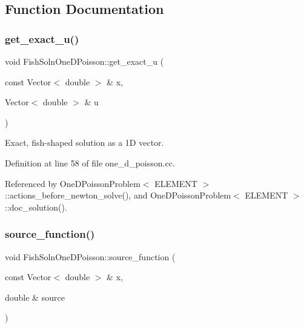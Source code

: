 \subsection{Function Documentation}
\mbox{\label{namespaceFishSolnOneDPoisson_a52c9346f567cb68fe20268a592deb4bc}} 
\subsubsection{\texorpdfstring{get\+\_\+exact\+\_\+u()}{get\_exact\_u()}}
{\footnotesize\ttfamily void Fish\+Soln\+One\+D\+Poisson\+::get\+\_\+exact\+\_\+u (\begin{DoxyParamCaption}\item[{const Vector$<$ double $>$ \&}]{x,  }\item[{Vector$<$ double $>$ \&}]{u }\end{DoxyParamCaption})}



Exact, fish-\/shaped solution as a 1D vector. 



Definition at line 58 of file one\+\_\+d\+\_\+poisson.\+cc.



Referenced by One\+D\+Poisson\+Problem$<$ E\+L\+E\+M\+E\+N\+T $>$\+::actions\+\_\+before\+\_\+newton\+\_\+solve(), and One\+D\+Poisson\+Problem$<$ E\+L\+E\+M\+E\+N\+T $>$\+::doc\+\_\+solution().

\mbox{\label{namespaceFishSolnOneDPoisson_afd2f5aef6b8868526dbf8e74d379697f}} 
\subsubsection{\texorpdfstring{source\+\_\+function()}{source\_function()}}
{\footnotesize\ttfamily void Fish\+Soln\+One\+D\+Poisson\+::source\+\_\+function (\begin{DoxyParamCaption}\item[{const Vector$<$ double $>$ \&}]{x,  }\item[{double \&}]{source }\end{DoxyParamCaption})}



